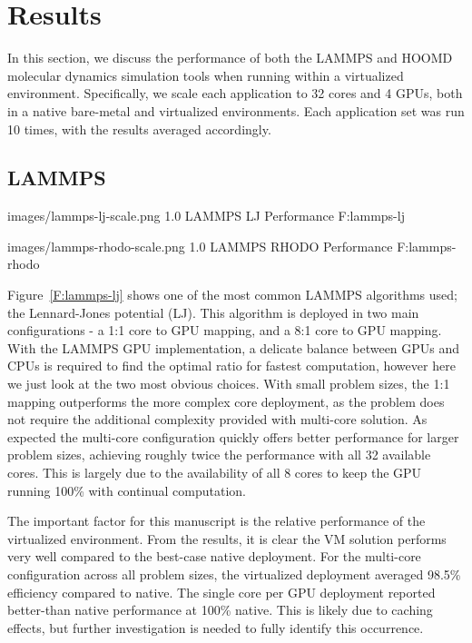 \documentclass[10pt]{sigplanconf}
\begin{document}
 
\section{Results}\label{results}

In this section, we discuss the performance of both the LAMMPS and HOOMD molecular dynamics simulation tools when running within a virtualized environment. Specifically, we scale each application to 32 cores and 4 GPUs, both in a native bare-metal and virtualized environments.  Each application set was run 10 times, with the results averaged accordingly. 

\subsection{LAMMPS}


  {images/lammps-lj-scale.png}
  {1.0}
  {LAMMPS LJ Performance}
  {F:lammps-lj}

  {images/lammps-rhodo-scale.png}
  {1.0}
  {LAMMPS RHODO Performance}
  {F:lammps-rhodo}


Figure~\ref{F:lammps-lj} shows one of the most common LAMMPS algorithms used; the Lennard-Jones potential (LJ).  This algorithm is deployed in two main configurations - a 1:1 core to GPU mapping, and a 8:1 core to GPU mapping.  With the LAMMPS GPU implementation, a delicate balance between GPUs and CPUs is required to find the optimal ratio for fastest computation, however here we just look at the two most obvious choices. With small problem sizes, the 1:1 mapping outperforms the more complex core deployment, as the problem does not require the additional complexity provided with multi-core solution.  As expected the multi-core configuration quickly offers better performance for larger problem sizes, achieving roughly twice the performance with all 32 available cores. This is largely due to the availability of all 8 cores to keep the GPU running 100\% with continual computation.
 
The important factor for this manuscript is the relative performance of the virtualized environment. From the results, it is clear the VM solution performs very well compared to the best-case native deployment. For the multi-core configuration across all problem sizes, the virtualized deployment averaged 98.5\% efficiency compared to native. The single core per GPU deployment reported better-than native performance at 100\% native.  This is likely due to caching effects, but further investigation is needed to fully identify this occurrence. 
\end{document}
